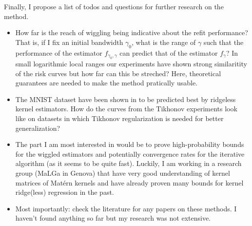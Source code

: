 \documentclass[12pt]{amsart}
\begin{document}
Finally, I propose a list of todos and questions for further research on 
the method.
\begin{itemize}
    \item How far is the reach of wiggling being indicative about the refit
        performance? That is, if I fix an initial bandwidth $\gamma_0$, 
        what is the range of $\gamma$ such that the performance of the 
        estimator $f_{\gamma_0, \gamma}$ can predict that of the estimator
        $f_\gamma$? In small logarithmic local ranges our experiments have
        shown strong similaritity of the risk curves but how far can this be 
        streched? Here, theoretical guarantees are needed to make the method
        pratically usable.
    \item The MNIST dataset have been shown in \cite{justinterpolate} to 
        be predicted best by ridgeless kernel estimators.
        How do the curves from the Tikhonov experiments look like on 
        datasets in which Tikhonov regularization is needed for better
        generalization?
    \item The part I am most interested in would be to prove high-probability
        bounds for the wiggled estimators and potentially convergence rates
        for the iterative algorithm (as it seems to be quite fast).
        Luckily, I am working in a research group (MaLGa in Genova) that 
        have very good understanding of kernel matrices of Matérn kernels
        and have already proven many bounds for kernel ridge(less) 
        regression in the past.
    \item Most importantly: check the literature for any papers on these
        methods. I haven't found anything so far but my research was not 
        extensive.
\end{itemize}
\end{document}
